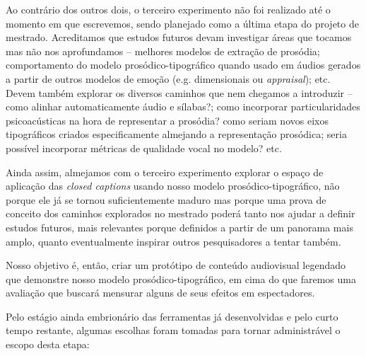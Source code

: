 \documentclass[a4paper]{tufte-handout}
\begin{document}
Ao contrário dos outros dois, o terceiro experimento não foi realizado até o momento em que escrevemos, sendo planejado como a última etapa do projeto de mestrado. Acreditamos que estudos futuros devam investigar áreas que tocamos mas não nos aprofundamos -- melhores modelos de extração de prosódia; comportamento do modelo prosódico-tipográfico quando usado em áudios gerados a partir de outros modelos de emoção (e.g. dimensionais ou \textit{appraisal}); etc. Devem também explorar os diversos caminhos que nem chegamos a introduzir -- como alinhar automaticamente áudio e sílabas?; como incorporar particularidades psicoacústicas na hora de representar a prosódia? como seriam novos eixos tipográficos criados especificamente almejando a representação prosódica; seria possível incorporar métricas de qualidade vocal no modelo? etc. 

Ainda assim, almejamos com o terceiro experimento explorar o espaço de aplicação das \textit{closed captions} usando nosso modelo prosódico-tipográfico, não porque ele já se tornou suficientemente maduro mas porque uma prova de conceito dos caminhos explorados no mestrado poderá tanto nos ajudar a definir estudos futuros, mais relevantes porque definidos a partir de um panorama mais amplo, quanto eventualmente inspirar outros pesquisadores a tentar também.

Nosso objetivo é, então, criar um protótipo de conteúdo audiovisual legendado que demonstre nosso modelo prosódico-tipográfico, em cima do que faremos uma avaliação que buscará mensurar alguns de seus efeitos em espectadores.

Pelo estágio ainda embrionário das ferramentas já desenvolvidas e pelo curto tempo restante, algumas escolhas foram tomadas para tornar administrável o escopo desta etapa:
\end{document}
